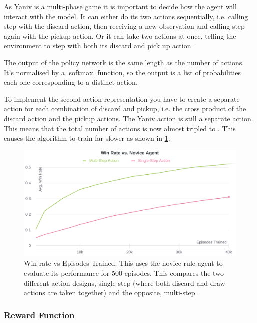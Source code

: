 \documentclass[../main.tex]{subfiles}
\begin{document}
As Yaniv is a multi-phase game it is important to decide how the agent will interact with the model. It can either do its two actions sequentially, i.e. calling step with the discard action, then receiving a new observation and calling step again with the pickup action. Or it can take two actions at once, telling the environment to step with both its discard and pick up action. 

The output of the policy network is the same length as the number of actions. It's normalised by a |softmax| function, so the output is a list of probabilities each one corresponding to a distinct action. 

To implement the second action representation you have to create a separate action for each combination of discard and pickup, i.e. the cross product of the discard action and the pickup actions. The Yaniv action is still a separate action. This means that the total number of actions is now almost tripled to . This causes the algorithm to train far slower as shown in \cref{fig:multi_vs_single_actions}.

\begin{figure}
    \centering
    \includegraphics[width=\textwidth,keepaspectratio]{images/method/multi_vs_single_actions.png}
    \caption{Win rate vs Episodes Trained. This uses the novice rule agent to evaluate its performance for 500 episodes. This compares the two different action designs, single-step (where both discard and draw actions are taken together) and the opposite, multi-step.}
    \label{fig:multi_vs_single_actions}
\end{figure}


\subsubsection{Reward Function}
\end{document}
